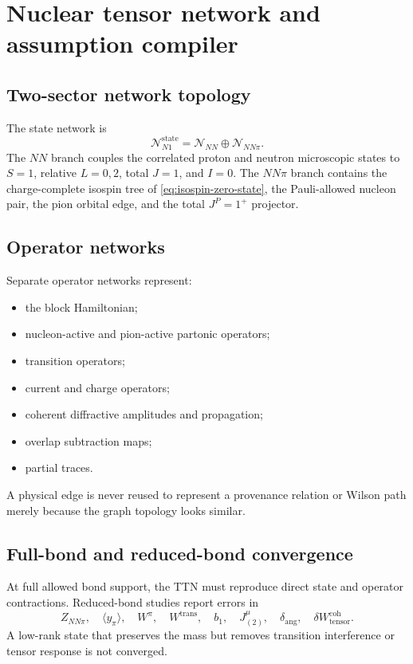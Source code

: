 \documentclass[11pt]{article}
\newcommand{\cN}{\mathcal N}
\begin{document}
\section{Nuclear tensor network and assumption compiler}
\label{sec:tn}

\subsection{Two-sector network topology}

The state network is
\begin{equation}
 \cN_{N1}^{\mathrm{state}}
 =\cN_{NN}\oplus\cN_{NN\pi}.
 \label{eq:n1-state-network}
\end{equation}
The \(NN\) branch couples the correlated proton and neutron microscopic states
to \(S=1\), relative \(L=0,2\), total \(J=1\), and \(I=0\).  The \(NN\pi\)
branch contains the charge-complete isospin tree of
\cref{eq:isospin-zero-state}, the Pauli-allowed nucleon pair, the pion orbital
edge, and the total \(J^P=1^+\) projector.

\subsection{Operator networks}

Separate operator networks represent:
\begin{itemize}
\item the block Hamiltonian;
\item nucleon-active and pion-active partonic operators;
\item transition operators;
\item current and charge operators;
\item coherent diffractive amplitudes and propagation;
\item overlap subtraction maps;
\item partial traces.
\end{itemize}
A physical edge is never reused to represent a provenance relation or Wilson
path merely because the graph topology looks similar.

\subsection{Full-bond and reduced-bond convergence}

At full allowed bond support, the TTN must reproduce direct state and operator
contractions.  Reduced-bond studies report errors in
\begin{equation}
 Z_{NN\pi},
 \quad
 \langle y_{\pi}\rangle,
 \quad
 W^{\pi},
 \quad
 W^{\mathrm{trans}},
 \quad
 b_1,
 \quad
 J_{(2)}^{\mu},
 \quad
 \delta_{\mathrm{ang}},
 \quad
 \delta W_{\mathrm{tensor}}^{\mathrm{coh}}.
 \label{eq:n1-bond-observables}
\end{equation}
A low-rank state that preserves the mass but removes transition interference
or tensor response is not converged.
\end{document}
